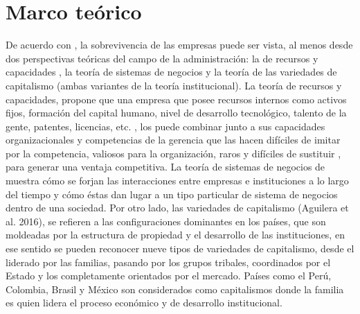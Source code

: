 \documentclass[12pt]{article}
\begin{document}
        \section{Marco teórico}
        De acuerdo con \cite{Chit}, la sobrevivencia de las empresas puede ser vista, al menos desde dos
        perspectivas teóricas del campo de la administración: la de recursos y capacidades \cite{Penrose}, la teoría de sistemas
        de negocios y la teoría de las variedades de capitalismo (ambas variantes de la teoría institucional).
        La teoría de recursos y capacidades, propone que una empresa que posee recursos internos como activos fijos,
        formación del capital humano, nivel de desarrollo tecnológico, talento de la gente, patentes, licencias, etc.
         \cite{Wernerfelt}, los puede combinar junto a sus capacidades organizacionales y competencias de la gerencia
        que las hacen difíciles de imitar por la competencia, valiosos para la organización, raros y difíciles de
        sustituir \cite{Barney}, para generar una ventaja competitiva.
        La teoría de sistemas de negocios de \cite{Whitley} muestra cómo se forjan las interacciones entre empresas
        e instituciones a lo largo del tiempo y cómo éstas dan lugar a un tipo particular de sistema de negocios
        dentro de una sociedad. Por otro lado, las variedades de capitalismo (Aguilera et al. 2016), se refieren a
        las configuraciones dominantes en los países, que son moldeadas por la estructura de propiedad y el desarrollo
        de las instituciones, en ese sentido se pueden reconocer nueve tipos de variedades de capitalismo, desde el
        liderado por las familias, pasando por los grupos tribales, coordinados por el Estado y los completamente
        orientados por el mercado. Países como el Perú, Colombia, Brasil y México son considerados como capitalismos
        donde la familia es quien lidera el proceso económico y de desarrollo institucional.
\end{document}
